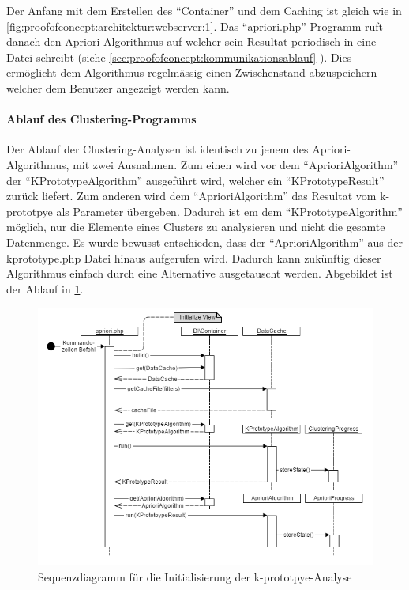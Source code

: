 Der Anfang mit dem Erstellen des "`Container"' und dem Caching ist gleich wie in \cref{fig:proofofconcept:architektur:webserver:1}. Das "`apriori.php"' Programm ruft danach den Apriori-Algorithmus auf welcher sein Resultat periodisch in eine Datei schreibt (siehe \cref{sec:proofofconcept:kommunikationsablauf} ). Dies ermöglicht dem Algorithmus regelmässig einen Zwischenstand abzuspeichern welcher dem Benutzer angezeigt werden kann.

\paragraph{Ablauf des Clustering-Programms}
Der Ablauf der Clustering-Analysen ist identisch zu jenem des Apriori-Algorithmus, mit zwei Ausnahmen. Zum einen wird vor dem "`AprioriAlgorithm"' der "`KPrototypeAlgorithm"' ausgeführt wird, welcher ein "`KPrototypeResult"' zurück liefert. 
Zum anderen wird dem "`AprioriAlgorithm"' das Resultat vom k-prototpye als Parameter übergeben. Dadurch ist em dem "`KPrototypeAlgorithm"' möglich, nur die Elemente eines Clusters zu analysieren und nicht die gesamte Datenmenge. 
Es wurde bewusst entschieden, dass der "`AprioriAlgorithm"' aus der kprototype.php Datei hinaus aufgerufen wird. Dadurch kann zukünftig dieser Algorithmus einfach durch eine Alternative ausgetauscht werden.
Abgebildet ist der Ablauf in \cref{fig:proofofconcept:architektur:hintergrundprozesser:2}. 
\begin{figure}[H]
	\centering
	\includegraphics[width=1\textwidth]{images/diagram-sequence-kprototype}
	\caption{Sequenzdiagramm für die Initialisierung der k-prototpye-Analyse}
	\label{fig:proofofconcept:architektur:hintergrundprozesser:2}
\end{figure}

